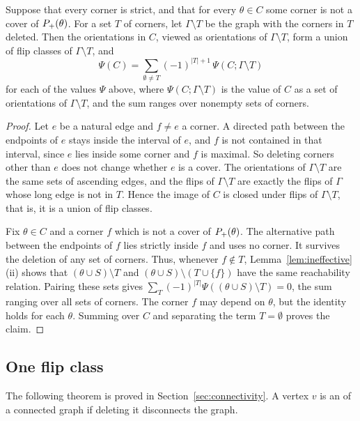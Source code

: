 \begin{lemma}\label{lem:noCover}
Suppose that every corner is strict, and that for every $\theta\in C$ some corner
is not a cover of $P_{+}(\theta)$.
For a set $T$ of corners, let $\Gamma\setminus T$ be the graph with the corners
in $T$ deleted.
Then the orientations in $C$, viewed as orientations of $\Gamma\setminus T$,
form a union of flip classes of $\Gamma\setminus T$, and
\[
 \Psi(C)=\sum_{\emptyset\neq T}(-1)^{|T|+1}\,\Psi(C;\Gamma\setminus T)
\]
for each of the values $\Psi$ above, where $\Psi(C;\Gamma\setminus T)$ is the value
of $C$ as a set of orientations of $\Gamma\setminus T$, and the sum ranges over
nonempty sets of corners.
\end{lemma}

\begin{proof}
Let $e$ be a natural edge and $f\neq e$ a corner.
A directed path between the endpoints of $e$ stays inside the interval of $e$,
and $f$ is not contained in that interval, since $e$ lies inside some corner and
$f$ is maximal.
So deleting corners other than $e$ does not change whether $e$ is a cover.
The orientations of $\Gamma\setminus T$ are the same sets of ascending edges,
and the flips of $\Gamma\setminus T$ are exactly the flips of $\Gamma$ whose
long edge is not in $T$.
Hence the image of $C$ is closed under flips of $\Gamma\setminus T$, that is,
it is a union of flip classes.

Fix $\theta\in C$ and a corner $f$ which is not a cover of $P_{+}(\theta)$.
The alternative path between the endpoints of $f$ lies strictly inside $f$ and
uses no corner.
It survives the deletion of any set of corners.
Thus, whenever $f\notin T$, Lemma~\ref{lem:ineffective}(ii) shows that
$(\theta\cup S)\setminus T$ and
$(\theta\cup S)\setminus(T\cup\{f\})$ have the same reachability relation.
Pairing these sets gives $\sum_T(-1)^{|T|}\Psi((\theta\cup S)\setminus T)=0$, the
sum ranging over all sets of corners.
The corner $f$ may depend on $\theta$, but the identity holds for each $\theta$.
Summing over $C$ and separating the term $T=\emptyset$ proves the claim.
\end{proof}

\subsection{One flip class}

The following theorem is proved in Section~\ref{sec:connectivity}.
A vertex $v$ is an  of a connected graph if deleting it
disconnects the graph.

